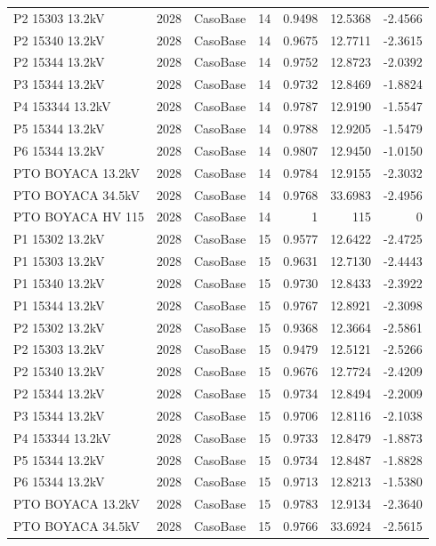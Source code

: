 \documentclass[11pt,a4paper]{article}
\begin{document}
\begin{longtable}{llllrrr}
P2 15303 13.2kV & 2028 & CasoBase & 14 & 0.9498 & 12.5368 & -2.4566 \\
P2 15340 13.2kV & 2028 & CasoBase & 14 & 0.9675 & 12.7711 & -2.3615 \\
P2 15344 13.2kV & 2028 & CasoBase & 14 & 0.9752 & 12.8723 & -2.0392 \\
P3 15344 13.2kV & 2028 & CasoBase & 14 & 0.9732 & 12.8469 & -1.8824 \\
P4 153344 13.2kV & 2028 & CasoBase & 14 & 0.9787 & 12.9190 & -1.5547 \\
P5 15344 13.2kV & 2028 & CasoBase & 14 & 0.9788 & 12.9205 & -1.5479 \\
P6 15344 13.2kV & 2028 & CasoBase & 14 & 0.9807 & 12.9450 & -1.0150 \\
PTO BOYACA 13.2kV & 2028 & CasoBase & 14 & 0.9784 & 12.9155 & -2.3032 \\
PTO BOYACA 34.5kV & 2028 & CasoBase & 14 & 0.9768 & 33.6983 & -2.4956 \\
PTO BOYACA HV 115 & 2028 & CasoBase & 14 & 1 & 115 & 0 \\
P1 15302 13.2kV & 2028 & CasoBase & 15 & 0.9577 & 12.6422 & -2.4725 \\
P1 15303 13.2kV & 2028 & CasoBase & 15 & 0.9631 & 12.7130 & -2.4443 \\
P1 15340 13.2kV & 2028 & CasoBase & 15 & 0.9730 & 12.8433 & -2.3922 \\
P1 15344 13.2kV & 2028 & CasoBase & 15 & 0.9767 & 12.8921 & -2.3098 \\
P2 15302 13.2kV & 2028 & CasoBase & 15 & 0.9368 & 12.3664 & -2.5861 \\
P2 15303 13.2kV & 2028 & CasoBase & 15 & 0.9479 & 12.5121 & -2.5266 \\
P2 15340 13.2kV & 2028 & CasoBase & 15 & 0.9676 & 12.7724 & -2.4209 \\
P2 15344 13.2kV & 2028 & CasoBase & 15 & 0.9734 & 12.8494 & -2.2009 \\
P3 15344 13.2kV & 2028 & CasoBase & 15 & 0.9706 & 12.8116 & -2.1038 \\
P4 153344 13.2kV & 2028 & CasoBase & 15 & 0.9733 & 12.8479 & -1.8873 \\
P5 15344 13.2kV & 2028 & CasoBase & 15 & 0.9734 & 12.8487 & -1.8828 \\
P6 15344 13.2kV & 2028 & CasoBase & 15 & 0.9713 & 12.8213 & -1.5380 \\
PTO BOYACA 13.2kV & 2028 & CasoBase & 15 & 0.9783 & 12.9134 & -2.3640 \\
PTO BOYACA 34.5kV & 2028 & CasoBase & 15 & 0.9766 & 33.6924 & -2.5615 \\

\end{longtable}
\end{document}

